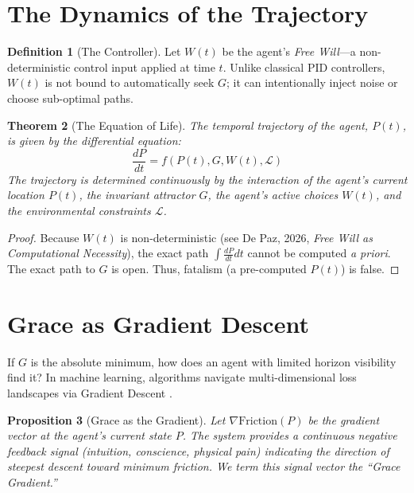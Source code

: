 \documentclass[12pt, a4paper]{article}
\theoremstyle{plain}
\newtheorem{theorem}{Theorem}[section]
\newtheorem{proposition}[theorem]{Proposition}
\theoremstyle{definition}
\newtheorem{definition}[theorem]{Definition}
\theoremstyle{remark}
\newcommand{\calL}{\mathcal{L}}
\begin{document}
\section{The Dynamics of the Trajectory}\label{sec:trajectory}

\begin{definition}[The Controller]
Let $W(t)$ be the agent's \emph{Free Will}---a non-deterministic control input applied at time $t$. Unlike classical PID controllers, $W(t)$ is not bound to automatically seek $G$; it can intentionally inject noise or choose sub-optimal paths.
\end{definition}

\begin{theorem}[The Equation of Life]
The temporal trajectory of the agent, $P(t)$, is given by the differential equation:
\begin{equation}
    \frac{dP}{dt} = f(P(t), G, W(t), \calL)
\end{equation}
The trajectory is determined continuously by the interaction of the agent's current location $P(t)$, the invariant attractor $G$, the agent's active choices $W(t)$, and the environmental constraints $\calL$.
\end{theorem}

\begin{proof}
Because $W(t)$ is non-deterministic (see De Paz, 2026, \textit{Free Will as Computational Necessity}), the exact path $\int \frac{dP}{dt} dt$ cannot be computed \textit{a priori}. The exact path to $G$ is open. Thus, fatalism (a pre-computed $P(t)$) is false.
\end{proof}

\section{Grace as Gradient Descent}\label{sec:grace}

If $G$ is the absolute minimum, how does an agent with limited horizon visibility find it? In machine learning, algorithms navigate multi-dimensional loss landscapes via Gradient Descent \citep{Cauchy1847}. 

\begin{proposition}[Grace as the Gradient]
Let $\nabla \text{Friction}(P)$ be the gradient vector at the agent's current state $P$. The system provides a continuous negative feedback signal (intuition, conscience, physical pain) indicating the direction of steepest descent toward minimum friction. We term this signal vector the ``Grace Gradient.''
\end{proposition}
\end{document}
